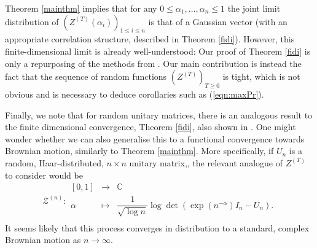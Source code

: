 \documentclass{article}
\newcommand{\1}{\mathds{1}}
\numberwithin{equation}{section}
\newcommand{\eps}{\varepsilon}
\renewcommand{\leq}{\leqslant}
\renewcommand{\geq}{\geqslant}
\newcommand{\R}{\mathbb{R}}
\newcommand{\C}{\mathbb{C}}
\theoremstyle{plain} %
\newtheorem{proposition}[theorem]{Proposition}
\begin{document}
Theorem \ref{mainthm} implies that  for any 
 $0 \leq \alpha_1, \ldots, \alpha_n \leq 1$ the joint limit distribution of $(Z^{(T)}(\alpha_i))_{1 \leq i \leq n}$ is that of a Gaussian vector (with an appropriate correlation structure, described in Theorem \ref{fidi}). However, this finite-dimensional limit is already well-understood: Our proof of Theorem \ref{fidi} is only a repurposing of the methods from \cite{bourgade}. Our main contribution is instead the fact that the sequence of random functions $(Z^{(T)})_{T \geq 0}$ is tight, which is not  obvious and is necessary to deduce corollaries such as (\ref{eqn:maxPr}).


Finally, we note that for random unitary matrices, there is an analogous result to the finite dimensional convergence,  Theorem \ref{fidi}, also shown in \cite{bourgade}. One might wonder whether we can also generalise this to a functional convergence towards Brownian motion, similarly to Theorem \ref{mainthm}. More specifically, if $U_n$ is a random, Haar-distributed,  $n\times n$ unitary matrix,,  the relevant analogue of $Z^{(T)}$ to consider would be
\begin{displaymath}
\mathcal{Z}^{(n)}:
\left.
  \begin{array}{rcl}
    [0, 1] & \longrightarrow &\C \\
    \alpha & \longmapsto & \dfrac{1}{\sqrt{\log n}}\log\det(\exp(n^{- \alpha})I_n - U_n).\\
  \end{array}
\right.
\end{displaymath}
It seems likely that this process converges in distribution to a standard, complex Brownian motion as $n\to\infty$.
%
%
%
\end{document}
